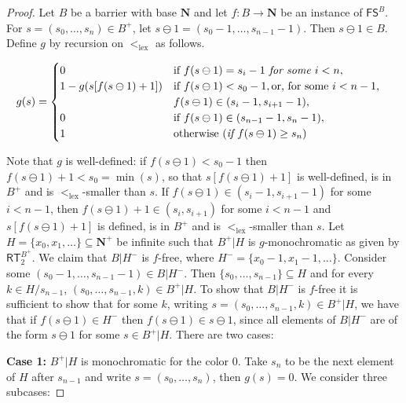 \documentclass{amsart}
\theoremstyle{plain}
\theoremstyle{plain}
\newcommand{\lex}{\mathrm{lex}}
\newcommand\Nat{\mathbf{N}}
\newcommand\RT{\mathsf{RT}}
\newcommand\FS{\mathsf{FS}}
\begin{document}
\begin{proof}
Let $B$ be a barrier with base $\Nat$ and let $f:B\to \Nat$ be an instance of $\FS^B$.
For $s = (s_0, \dots, s_n) \in B^+$, let $s\ominus 1 = (s_0 - 1, \dots, s_{n-1}-1)$. Then $s \ominus 1 \in B$. Define $g$ by recursion on $<_{\lex}$ as follows. 

\begin{equation*}
    g(s) = \begin{cases}
           0 \hspace{1.5cm} & \text{if } f(s\ominus 1) = s_i-1 \textit{ for some } i  < n,  \\
           1 - g(s[f(s\ominus 1)+1]) & \text{if } f(s\ominus 1) < s_0 - 1, \text{or, for some } i < n-1,\\
           \hspace{1.2cm} & f(s\ominus 1) \in (s_i-1, s_{i+1}-1),\\
           0 \hspace{1.5cm} & \text{if } f(s\ominus 1) \in (s_{n-1}-1, s_n-1), \\
           1 \hspace{1.5cm} & \text{otherwise } (\textit{if } f(s\ominus 1) \geq s_n)   
           \end{cases} \quad
\end{equation*}

Note that $g$ is well-defined: if $f(s \ominus 1) < s_0 - 1$ then $f(s \ominus 1) + 1 < s_0 = \min(s)$, so that 
$s[f(s\ominus 1)+1]$ is well-defined, is in $B^+$ and is $<_\lex$-smaller than $s$. If $f(s\ominus 1) \in (s_i-1, s_{i+1}-1)$ for some  $i < n - 1$, then $f(s\ominus 1) +1 \in (s_i, s_{i+1})$ for some $i< n-1$ and $s[f(s\ominus 1)+1]$ is defined, is in $B^+$ and is $<_\lex$-smaller than $s$. 
Let $H = \{x_0, x_1, \dots \}\subseteq \Nat^+$ be infinite such that $B^+ | H$ is $g$-monochromatic as given by $\RT^{B^+}_2$. We claim that $B\vert H^-$ is $f$-free, where $H^- = \{x_0 - 1, x_1 - 1, \dots \}$. 
Consider some $(s_0 - 1, \dots, s_{n - 1} - 1) \in B\vert H^-$. Then $\{s_0, \dots, s_{n - 1}\} \subseteq H$ and for every $k \in H/s_{n-1}$, $(s_0, \dots, s_{n-1}, k) \in B^+\vert H$. 
To show that $B\vert H^-$ is $f$-free it is sufficient to show that for some $k$, writing $s=(s_0,\ldots,s_{n-1}, k) \in B^+\vert H$, we have that if $f(s\ominus 1) \in H^-$ then $f(s\ominus 1) \in s\ominus 1$, since all elements of $B\vert H^-$ are of the form $s\ominus 1$ for some $s \in B^+\vert H$. 
There are two cases:

\textbf{Case 1:} $B^+\vert H$ is monochromatic for the color $0$. Take $s_n$ to be the next element of $H$ after $s_{n - 1}$ and write $s = (s_0, \dots, s_{n})$, then $g(s) = 0$. We consider three subcases:


\end{proof}
\end{document}
